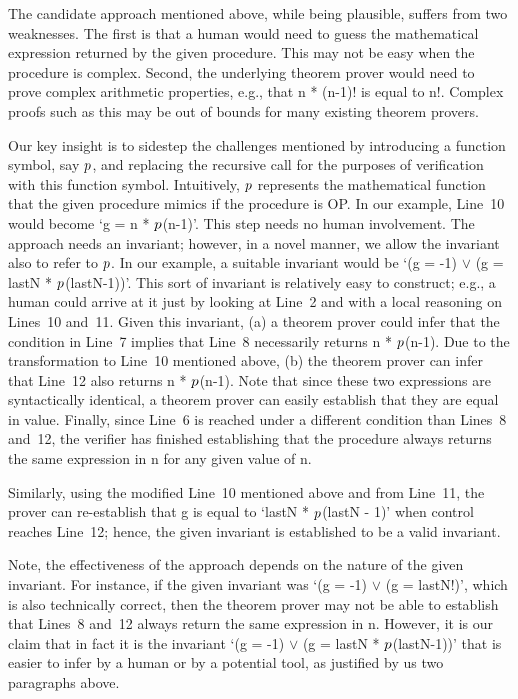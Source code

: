 The candidate approach mentioned above, while being plausible, suffers from
two weaknesses. The first is that a human would need to guess the
mathematical expression returned by the given procedure. This may not be
easy when the procedure is complex. Second, the underlying theorem prover
would need to prove complex arithmetic properties, e.g., that n * (n-1)! is
equal to n!. Complex proofs such as this may be out of bounds for many
existing theorem provers.

Our key insight is to sidestep the challenges mentioned by introducing a
function symbol, say $p$, and replacing the recursive call for the purposes
of verification with this function symbol. Intuitively, $p$ represents the
mathematical function that the given procedure mimics if the procedure is
OP.  In our example, Line~10 would become `g = n * $p$(n-1)'. This step
needs no human involvement. The approach needs an invariant; however, in a
novel manner, we allow the invariant also to refer to $p$. In our example,
a suitable invariant would be `(g = -1) $\vee$ (g = lastN *
$p$(lastN-1))'. This sort of invariant is relatively easy to construct;
e.g., a human could arrive at it just by looking at Line~2 and with a local
reasoning on Lines~10 and~11. Given this invariant, (a) a theorem prover
could infer that the condition in Line~7 implies that Line~8 necessarily
returns n * $p$(n-1). Due to the transformation to Line~10 mentioned above,
(b) the theorem prover can infer that Line~12 also returns n *
$p$(n-1). Note that since these two expressions are syntactically
identical, a theorem prover can easily establish that they are equal in
value.  Finally, since Line~6 is reached under a different condition than
Lines~8 and~12, the verifier has finished establishing that the procedure
always returns the same expression in n for any given value of n.

Similarly, using the modified Line~10 mentioned above and from Line~11, the
prover can re-establish that g is equal to `lastN * $p$(lastN - 1)' when
control reaches Line~12; hence, the given invariant is established to be a
valid invariant.

Note, the effectiveness of the approach depends on the nature of the given
invariant. For instance, if the given invariant was `(g = -1) $\vee$ (g =
lastN!)', which is also technically correct, then the theorem prover may
not be able to establish that Lines~8 and~12 always return the same
expression in n. However, it is our claim that in fact it is the invariant
`(g = -1) $\vee$ (g = lastN * $p$(lastN-1))' that is easier to infer by a
human or by a potential tool, as justified by us two paragraphs above.


